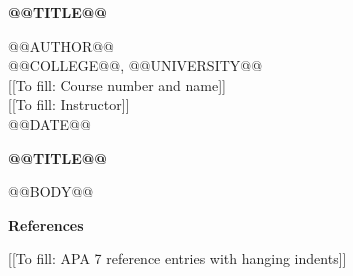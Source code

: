 \documentclass[12pt,letterpaper]{article}
\renewcommand{\missingfield}[1]{\textcolor{red!70!black}{[[To fill: #1]]}}
\begin{document}
\hypersetup{pageanchor=false}
\begin{titlepage}
  \thispagestyle{fancy}
  \vspace*{1.2in}
  \begin{center}
    {\bfseries @@TITLE@@\par}
    \vspace{1em}
    @@AUTHOR@@\\
    @@COLLEGE@@, @@UNIVERSITY@@\\
    \missingfield{Course number and name}\\
    \missingfield{Instructor}\\
    @@DATE@@
  \end{center}
\end{titlepage}
\hypersetup{pageanchor=true}
\setcounter{page}{2}

\begin{center}\textbf{@@TITLE@@}\end{center}
@@BODY@@

\newpage
\begin{center}\textbf{References}\end{center}
\noindent\missingfield{APA 7 reference entries with hanging indents}
\end{document}
